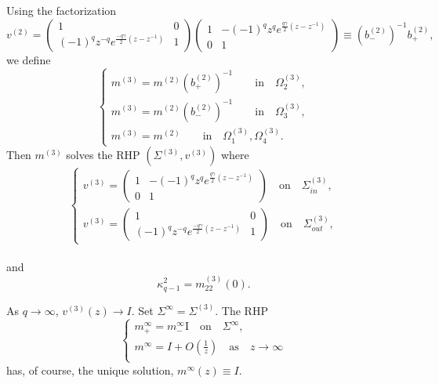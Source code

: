 \documentclass{amsart}
\theoremstyle{definition}
\theoremstyle{remark}
\numberwithin{equation}{section}
\begin{document}
Using the factorization 
\begin{equation*}
    v^{(2)}= \begin{pmatrix} 1&0\\
(-1)^qz^{-q}e^{\frac{-q\gamma}{2}(z-z^{-1})}&1\end{pmatrix}
    \begin{pmatrix} 1&-(-1)^qz^qe^{\frac{q\gamma}{2}(z-z^{-1})}\\0&1\end{pmatrix}
\equiv (b_-^{(2)})^{-1}b_+^{(2)},
\end{equation*}
we define 
\begin{equation*}
  \begin{cases}
     m^{(3)}=m^{(2)} (b_+^{(2)})^{-1}
\qquad\text{in}\quad \Omega^{(3)}_2,\\
     m^{(3)}=m^{(2)} (b_-^{(2)})^{-1}
\qquad\text{in}\quad \Omega^{(3)}_3,\\
     m^{(3)}=m^{(2)} 
\qquad\text{in}\quad \Omega^{(3)}_1, \Omega^{(3)}_4.
  \end{cases}
\end{equation*}
Then $m^{(3)}$ solves the RHP $(\Sigma^{(3)},v^{(3)})$ where 
\begin{equation}\label{e-sec2.5}
  \begin{cases}
    v^{(3)} = \begin{pmatrix} 1&-(-1)^qz^qe^{\frac{q\gamma}{2}(z-z^{-1})}\\0&1
              \end{pmatrix} \quad\text{on}\quad\Sigma_{in}^{(3)},\\
    v^{(3)} = \begin{pmatrix} 1&0\\(-1)^qz^{-q}e^{\frac{-q\gamma}{2}(z-z^{-1})}&1
              \end{pmatrix} \quad\text{on}\quad\Sigma_{out}^{(3)},
  \end{cases}
\end{equation}\\
and 
\begin{equation}\label{e-z1}
  \kappa^2_{q-1}= m_{22}^{(3)}(0). 
\end{equation}

As $q\to\infty$, $v^{(3)}(z)\to I$.
Set $\Sigma^{\infty}=\Sigma^{(3)}$.
The RHP 
\begin{equation}
\begin{cases}
m^{\infty}_+=m^{\infty}_-\text{I} \quad\text{on}\quad \Sigma^{\infty}, \\
m^{\infty}=I+O(\frac1z) \quad\text{as}\quad z\rightarrow \infty\\
\end{cases}
\end{equation}
has, of course, the unique solution, $m^{\infty}(z)\equiv I$. 
\end{document}
